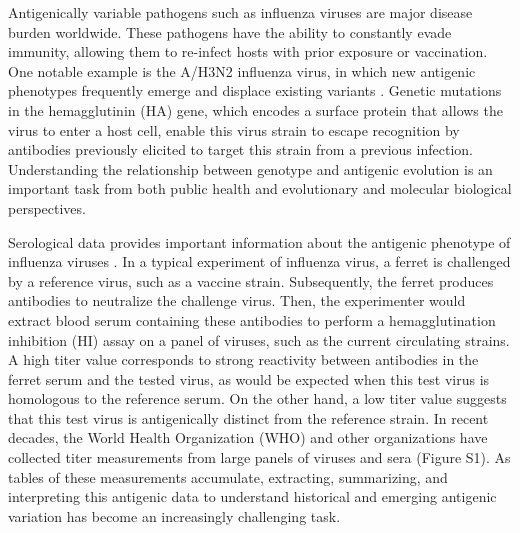 \documentclass[11pt,oneside,letterpaper]{article}
\begin{document}
Antigenically variable pathogens such as influenza viruses are major disease burden worldwide. 
These pathogens have the ability to constantly evade immunity, allowing them to re-infect hosts with prior exposure or vaccination. 
One notable example is the A/H3N2 influenza virus, in which new antigenic phenotypes frequently emerge and displace existing variants \cite{smith_mapping_2004, bedford_integrating_2014}.
Genetic mutations in the hemagglutinin (HA) gene, which encodes a surface protein that allows the virus to enter a host cell, enable this virus strain to escape recognition by antibodies previously elicited to target this strain from a previous infection. 
Understanding the relationship between genotype and antigenic evolution is an important task from both public health and evolutionary and molecular biological perspectives.

Serological data provides important information about the antigenic phenotype of influenza viruses \cite{smith_mapping_2004}. 
In a typical experiment of influenza virus, a ferret is challenged by a reference virus, such as a vaccine strain.
Subsequently, the ferret produces antibodies to neutralize the challenge virus. 
Then, the experimenter would extract blood serum containing these antibodies to perform a hemagglutination inhibition (HI) assay  on a panel of viruses, such as the current circulating strains. 
A high titer value corresponds to strong reactivity between antibodies in the ferret serum and the tested virus, as would be expected when this test virus is homologous to the reference serum.
On the other hand, a low titer value suggests that this test virus is antigenically distinct from the reference strain. 
In recent decades, the World Health Organization (WHO) and other organizations have collected titer measurements from large panels of viruses and sera \cite{Smith04,Kendal78,Webster79,Nakajima79,Nakajima81,Chakraverty82,Pereira82,Chakraverty86,Cox83,Daniels85,Raymond86,Stevens87,Donatelli93,Hay01,Daum02,McDonald07,Barr10} (Figure S1).
As tables of these measurements accumulate, extracting, summarizing, and interpreting this antigenic data to understand historical and emerging antigenic variation has become an increasingly challenging task. %
\end{document}
